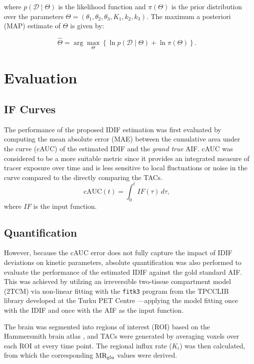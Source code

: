 where \( p(\mathcal{D} \mid \Theta) \) is the likelihood function and \( \pi(\Theta) \) is the prior distribution over the parameters \( \Theta = (\theta_{1}, \theta_{2}, \theta_{3}, K_{1}, k_{2}, k_{3}) \). The maximum a posteriori (MAP) estimate of \( \Theta \) is given by:

\begin{equation}
	\hat{\Theta}
	=
	\arg\max_{\Theta}
	\left\{
	\ln p(\mathcal{D} \mid \Theta)
	+
	\ln \pi(\Theta)
	\right\}.
\end{equation}



\section{Evaluation}
\subsection{IF Curves}
The performance of the proposed IDIF estimation was first evaluated by computing the mean absolute error (MAE) between the cumulative area under the curve (cAUC) of the estimated IDIF and the \textit{grand true} AIF. cAUC was considered to be a more suitable metric since it provides an integrated measure of tracer exposure over time and is less sensitive to local fluctuations or noise in the curve compared to the directly comparing the TACs.
\begin{equation}
	\textrm{cAUC}(t) =  \int_{0}^{t} IF(\tau) \, d\tau,
\end{equation}
where \(IF\) is the input function.

\subsection{Quantification}
However, because the cAUC error does not fully capture the impact of IDIF deviations on kinetic parameters, absolute quantification was also performed to evaluate the performance of the estimated IDIF against the gold standard AIF.
This was achieved by utilzing an irreversible two-tissue compartment model (2TCM) via non-linear fitting with the \texttt{fitk3} program from the TPCCLIB library developed at the Turku PET Centre \cite{oikonen2018tpcclib}—applying the model fitting once with the IDIF and once with the AIF as the input function.

The brain was segmented into regions of interest (ROI) based on the Hammersmith brain atlas \cite{hammers2003three}, and TACs were generated by averaging voxels over each ROI at every time point.
The regional influx rate (\(K_i\)) was then calculated, from which the corresponding \(\text{MR}_{\text{glu}}\) values were derived.

